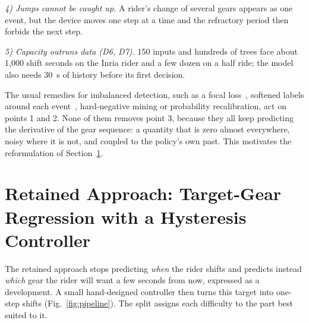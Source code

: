 \documentclass[conference]{IEEEtran}
\begin{document}
\emph{4) Jumps cannot be caught up.} A rider's change of several gears appears as one event, but the device moves one step at a time and the refractory period then forbids the next step.

\emph{5) Capacity outruns data (D6, D7).} 150 inputs and hundreds of trees face about 1,000 shift seconds on the Inria rider and a few dozen on a half ride; the model also needs 30~s of history before its first decision.

The usual remedies for imbalanced detection, such as a focal loss~\cite{focal}, softened labels around each event~\cite{cioppa}, hard-negative mining or probability recalibration, act on points 1 and 2. None of them removes point 3, because they all keep predicting the derivative of the gear sequence: a quantity that is zero almost everywhere, noisy where it is not, and coupled to the policy's own past. This motivates the reformulation of Section~\ref{sec:method}.

\section{Retained Approach: Target-Gear Regression with a Hysteresis Controller}\label{sec:method}
The retained approach stops predicting \emph{when} the rider shifts and predicts instead \emph{which} gear the rider will want a few seconds from now, expressed as a development. A small hand-designed controller then turns this target into one-step shifts (Fig.~\ref{fig:pipeline}). The split assigns each difficulty to the part best suited to it.
\end{document}
